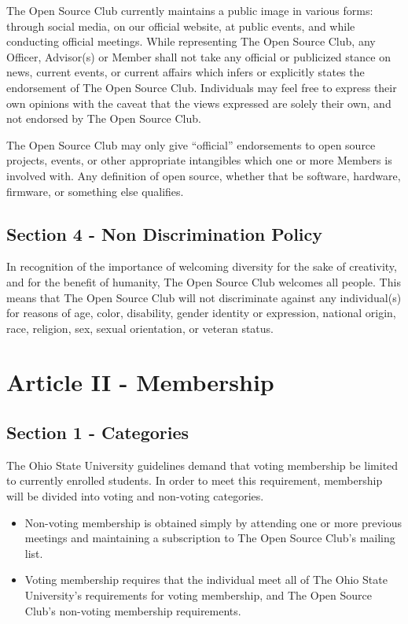 \documentclass{article}
\begin{document}
  The Open Source Club currently maintains a public image in various forms: through social media, on our official website, at public events, and while conducting official meetings. While representing The Open Source Club, any Officer, Advisor(s) or Member shall not take any official or publicized stance on news, current events, or current affairs which infers or explicitly states the endorsement of The Open Source Club. Individuals may feel free to express their own opinions with the caveat that the views expressed are solely their own, and not endorsed by The Open Source Club.

  The Open Source Club may only give ``official'' endorsements to open source projects, events, or other appropriate intangibles which one or more Members is involved with. Any definition of open source, whether that be software, hardware, firmware, or something else qualifies.

	\subsection{Section 4 - Non Discrimination Policy}

	In recognition of the importance of welcoming diversity for the sake of creativity, and for the benefit of humanity, The Open Source Club welcomes all people. This means that The Open Source Club will not discriminate against any individual(s) for reasons of age, color, disability, gender identity or expression, national origin, race, religion, sex, sexual orientation, or veteran status.

	\section{Article II - Membership}

	\subsection{Section 1 - Categories}

	The Ohio State University guidelines demand that voting membership be limited to currently enrolled students. In order to meet this requirement, membership will be divided into voting and non-voting categories.

	\begin{itemize}
		\item Non-voting membership is obtained simply by attending one or more previous meetings and maintaining a subscription to The Open Source Club's mailing list.
		\item Voting membership requires that the individual meet all of The Ohio State University's requirements for voting membership, and The Open Source Club's non-voting membership requirements.
	\end{itemize}
\end{document}
